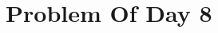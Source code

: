 \documentclass{article}
\newcommand{\YearPath}{../../../LatexConfig} %
\newcommand{\SemesterPath}{../../LatexConfig} %
\newcommand{\ClassPath}{../LatexConfig} %
\begin{document}




\section{Problem Of Day 8}

\end{document}
